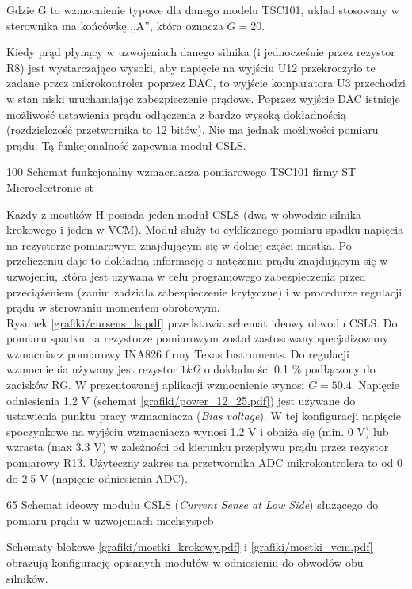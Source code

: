 Gdzie G to wzmocnienie typowe dla danego modelu TSC101, układ stosowany w sterownika ma końcówkę ,,A'', która oznacza $ G = 20 $.

Kiedy prąd płynący w uzwojeniach danego silnika (i jednocześnie przez rezystor R8) jest wystarczająco wysoki, aby napięcie na wyjściu U12 przekroczyło te zadane przez mikrokontroler poprzez DAC, to wyjście komparatora U3 przechodzi w stan niski uruchamiając zabezpieczenie prądowe. Poprzez wyjście DAC istnieje możliwość ustawienia prądu odłączenia z bardzo wysoką dokładnością (rozdzielczość przetwornika to 12 bitów). Nie ma jednak możliwości pomiaru prądu. Tą funkcjonalność zapewnia moduł CSLS.

	{100}
	{Schemat funkcjonalny wzmacniacza pomiarowego TSC101 firmy ST Microelectronic}
	{st}


Każdy z mostków H posiada jeden moduł CSLS (dwa w obwodzie silnika krokowego i jeden w VCM). Moduł służy to cyklicznego pomiaru spadku napięcia na rezystorze pomiarowym znajdującym się w dolnej części mostka. Po przeliczeniu daje to dokładną informację o natężeniu prądu znajdującym się w uzwojeniu, która jest używana w celu programowego zabezpieczenia przed przeciążeniem (zanim zadziała zabezpieczenie krytyczne) i w procedurze regulacji prądu w sterowaniu momentem obrotowym. \\

Rysunek \ref{grafiki/cursens_ls.pdf} przedstawia schemat ideowy obwodu CSLS. Do pomiaru spadku na rezystorze pomiarowym został zastosowany specjalizowany wzmacniacz pomiarowy INA826 firmy Texas Instruments. Do regulacji wzmocnienia używany jest rezystor $ 1 k\Omega $ o dokładności 0.1 \% podłączony do zacisków RG. W prezentowanej aplikacji wzmocnienie wynosi $ G = 50.4 $. Napięcie odniesienia 1.2 V (schemat \ref{grafiki/power_12_25.pdf}) jest używane do ustawienia punktu pracy wzmacniacza ({\it Bias voltage}). W tej konfiguracji napięcie spoczynkowe na wyjściu wzmacniacza wynosi 1.2 V i obniża się (min. 0 V) lub wzrasta (max 3.3 V) w zależności od kierunku przepływu prądu przez rezystor pomiarowy R13. Użyteczny zakres na przetwornika ADC mikrokontrolera to od 0 do 2.5 V (napięcie odniesienia ADC).

	{65}
	{Schemat ideowy modułu CSLS ({\it Current Sense at Low Side}) służącego do pomiaru prądu w uzwojeniach}
	{mechsyspcb}
	
Schematy blokowe \ref{grafiki/mostki_krokowy.pdf} i \ref{grafiki/mostki_vcm.pdf} obrazują konfigurację opisanych modułów w odniesieniu do obwodów obu silników.


